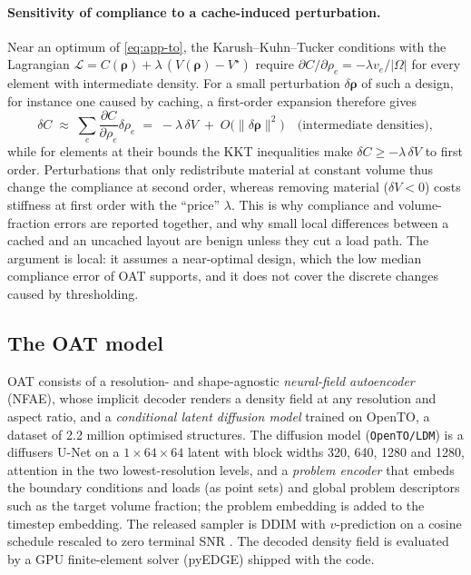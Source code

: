 \paragraph{Sensitivity of compliance to a cache-induced perturbation.} Near an optimum of \cref{eq:app-to}, the Karush--Kuhn--Tucker conditions with the Lagrangian $\mathcal L = C(\bm\rho) + \lambda\,(V(\bm\rho)-V^\star)$ require $\partial C/\partial\rho_e = -\lambda v_e/|\Omega|$ for every element with intermediate density. For a small perturbation $\delta\bm\rho$ of such a design, for instance one caused by caching, a first-order expansion therefore gives
\begin{equation}\label{eq:app-kkt}
  \delta C \;\approx\; \sum_e \frac{\partial C}{\partial\rho_e}\delta\rho_e \;=\; -\lambda\,\delta V \;+\; O\big(\|\delta\bm\rho\|^2\big) \quad\text{(intermediate densities)},
\end{equation}
while for elements at their bounds the KKT inequalities make $\delta C\ge-\lambda\,\delta V$ to first order. Perturbations that only redistribute material at constant volume thus change the compliance at second order, whereas removing material ($\delta V<0$) costs stiffness at first order with the ``price'' $\lambda$. This is why compliance and volume-fraction errors are reported together, and why small local differences between a cached and an uncached layout are benign unless they cut a load path. The argument is local: it assumes a near-optimal design, which the low median compliance error of OAT supports, and it does not cover the discrete changes caused by thresholding.

\subsection{The OAT model}
OAT \citep{nobari2025oat} consists of a resolution- and shape-agnostic \emph{neural-field autoencoder} (NFAE), whose implicit decoder renders a density field at any resolution and aspect ratio, and a \emph{conditional latent diffusion model} trained on OpenTO, a dataset of 2.2 million optimised structures. The diffusion model (\texttt{OpenTO/LDM}) is a diffusers U-Net on a $1\times64\times64$ latent with block widths 320, 640, 1280 and 1280, attention in the two lowest-resolution levels, and a \emph{problem encoder} that embeds the boundary conditions and loads (as point sets) and global problem descriptors such as the target volume fraction; the problem embedding is added to the timestep embedding. The released sampler is DDIM with $v$-prediction on a cosine schedule rescaled to zero terminal SNR \citep{lin2024zerosnr}. The decoded density field is evaluated by a GPU finite-element solver (pyEDGE) shipped with the code.


